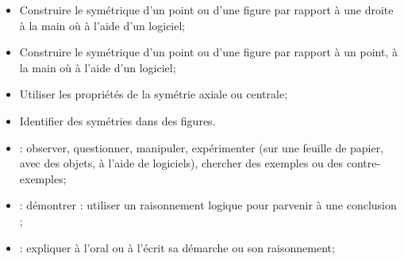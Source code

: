 \begin{myobj}
	\begin{itemize}
		
		\item Construire le symétrique d’un point ou d'une figure par rapport à une droite à la main où à l’aide d’un logiciel;
		\item Construire le symétrique d’un point ou d'une figure par rapport à un point, à la main où à l’aide d’un logiciel;
		\item Utiliser les propriétés de la symétrie axiale ou centrale;
		\item Identifier des symétries dans des figures.		
	\end{itemize}
\end{myobj}

\begin{mycomp}
	\begin{itemize}
		\item {} :  observer, questionner, manipuler, expérimenter (sur une feuille de papier, avec des objets, à l’aide de logiciels), chercher des exemples ou des contre-exemples;
		\item {} :  démontrer : utiliser un raisonnement logique pour parvenir à une conclusion ;
		\item {} :  expliquer à l’oral ou à l’écrit sa démarche ou son raisonnement; 
		
	\end{itemize}
\end{mycomp}


